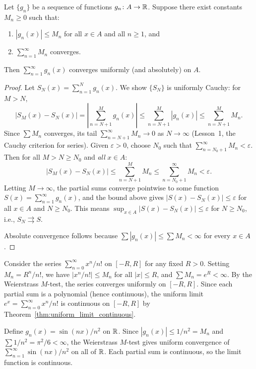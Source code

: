 \documentclass[11pt,a4paper]{article}
\begin{document}
\begin{theorem}
\label{thm:weierstrass_m_test}
Let $\{g_n\}$ be a sequence of functions $g_n \colon A \to \mathbb{R}$. Suppose
there exist constants $M_n \ge 0$ such that:
\begin{enumerate}[nosep,label=(\roman*)]
  \item $|g_n(x)| \le M_n$ for all $x \in A$ and all $n \ge 1$, and
  \item $\sum_{n=1}^\infty M_n$ converges.
\end{enumerate}
Then $\sum_{n=1}^\infty g_n(x)$ converges uniformly (and absolutely)
on $A$.
\end{theorem}

\begin{proof}
Let $S_N(x) = \sum_{n=1}^N g_n(x)$. We show $\{S_N\}$ is uniformly
Cauchy: for $M > N$,
\[
  |S_M(x) - S_N(x)| = \left|\sum_{n=N+1}^M g_n(x)\right|
  \le \sum_{n=N+1}^M |g_n(x)| \le \sum_{n=N+1}^M M_n.
\]
Since $\sum M_n$ converges, its tail $\sum_{n=N+1}^\infty M_n \to 0$ as
$N \to \infty$ (Lesson~1, the Cauchy criterion for series). Given
$\varepsilon > 0$, choose $N_0$ such that
$\sum_{n=N_0+1}^\infty M_n < \varepsilon$. Then for all $M > N \ge N_0$
and \emph{all} $x \in A$:
\[
  |S_M(x) - S_N(x)| \le \sum_{n=N+1}^M M_n
  \le \sum_{n=N_0+1}^\infty M_n < \varepsilon.
\]
Letting $M \to \infty$, the partial sums converge pointwise to some
function $S(x) = \sum_{n=1}^\infty g_n(x)$, and the bound above gives
$|S(x) - S_N(x)| \le \varepsilon$ for all $x \in A$ and $N \ge N_0$.
This means $\sup_{x \in A} |S(x) - S_N(x)| \le \varepsilon$ for
$N \ge N_0$, i.e., $S_N \rightrightarrows S$.

Absolute convergence follows because
$\sum |g_n(x)| \le \sum M_n < \infty$ for every $x \in A$.
\end{proof}

\begin{example}
\label{ex:power_series}
Consider the series $\sum_{n=0}^\infty x^n / n!$ on $[-R, R]$ for any
fixed $R > 0$. Setting $M_n = R^n / n!$, we have $|x^n / n!| \le M_n$
for all $|x| \le R$, and $\sum M_n = e^R < \infty$. By the Weierstrass
$M$-test, the series converges uniformly on $[-R, R]$. Since each
partial sum is a polynomial (hence continuous), the uniform limit
$e^x = \sum_{n=0}^\infty x^n / n!$ is continuous on $[-R, R]$ by
Theorem~\ref{thm:uniform_limit_continuous}.
\end{example}

\begin{example}
\label{ex:p_series}
Define $g_n(x) = \sin(nx) / n^2$ on $\mathbb{R}$. Since
$|g_n(x)| \le 1/n^2 = M_n$ and $\sum 1/n^2 = \pi^2/6 < \infty$, the
Weierstrass $M$-test gives uniform convergence of
$\sum_{n=1}^\infty \sin(nx)/n^2$ on all of $\mathbb{R}$. Each partial sum is
continuous, so the limit function is continuous.
\end{example}
\end{document}
